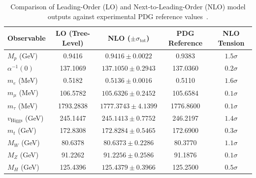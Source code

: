 \documentclass[11pt,a4paper]{article}
\begin{document}
\begin{table}[htbp]
\centering
\caption{Comparison of Leading-Order (LO) and Next-to-Leading-Order (NLO) model outputs against experimental PDG reference values~\cite{PDG2024}.}
\label{tab:sm_benchmarks}
\begin{tabular}{lcccc}
\toprule
\textbf{Observable} & \textbf{LO (Tree-Level)} & \textbf{NLO ($\pm\sigma_{\text{tot}}$)} & \textbf{PDG Reference} & \textbf{NLO Tension} \\
\midrule
$M_p$ (GeV) & 0.9416 & $0.9416 \pm 0.0022$ & 0.9383 & $1.5\sigma$ \\
$\alpha^{-1}(0)$ & 137.1069 & $137.1050 \pm 0.2943$ & 137.0360 & $0.2\sigma$ \\
$m_e$ (MeV) & 0.5182 & $0.5136 \pm 0.0016$ & 0.5110 & $1.6\sigma$ \\
$m_\mu$ (MeV) & 106.5782 & $105.6326 \pm 0.2452$ & 105.6584 & $0.1\sigma$ \\
$m_\tau$ (MeV) & 1793.2838 & $1777.3743 \pm 4.1399$ & 1776.8600 & $0.1\sigma$ \\
$v_{\text{Higgs}}$ (GeV) & 245.1447 & $245.1413 \pm 0.7752$ & 246.2197 & $1.4\sigma$ \\
$m_t$ (GeV) & 172.8308 & $172.8284 \pm 0.5465$ & 172.6900 & $0.3\sigma$ \\
$M_W$ (GeV) & 80.6378 & $80.6373 \pm 0.2286$ & 80.3770 & $1.1\sigma$ \\
$M_Z$ (GeV) & 91.2262 & $91.2256 \pm 0.2586$ & 91.1876 & $0.1\sigma$ \\
$M_H$ (GeV) & 125.4396 & $125.4379 \pm 0.3966$ & 125.2500 & $0.5\sigma$ \\
\bottomrule
\end{tabular}
\end{table}
\end{document}
